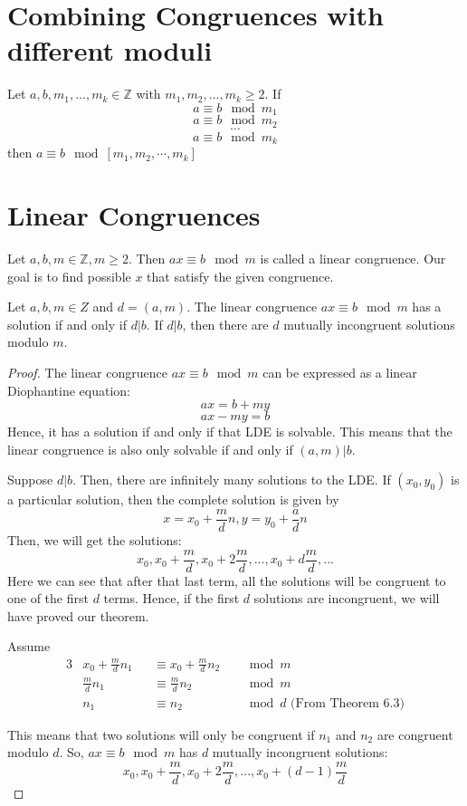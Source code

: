 \documentclass[12pt,letterpaper]{amsbook}
\theoremstyle{definition}
\newcommand{\Z}{\mathbb{Z}}
\begin{document}
\section{Combining Congruences with different moduli}
\phantom{}
\begin{theorem}
  Let $a,b,m_1,...,m_k \in \Z$ with $m_1,m_2,...,m_k \geq 2$. If
  \[a \equiv b \mod m_1\]
  \[a \equiv b \mod m_2\]
  \[\cdots\]
  \[a \equiv b \mod m_k\]
  then $a \equiv b \mod [m_1,m_2,\cdots,m_k]$
\end{theorem}

\section{Linear Congruences}

Let $a,b,m \in \Z, m \geq 2$. Then $ax \equiv b \mod m$ is called a linear congruence. Our goal is to find possible $x$ that satisfy the given congruence.

\begin{theorem}
  Let $a,b,m \in Z$ and $d = (a,m)$. The linear congruence $ax \equiv b \mod m$ has a solution if and only if $d | b$. If $d | b$, then there are $d$ mutually incongruent solutions modulo $m$.
\end{theorem}
\begin{proof}
  The linear congruence $ax \equiv b \mod m$ can be expressed as a linear Diophantine equation:
  \[ax = b + my\]
  \[ax - my = b\]
  Hence, it has a solution if and only if that LDE is solvable. This means that the linear congruence is also only solvable if and only if $(a,m) | b$.

  Suppose $d|b$. Then, there are infinitely many solutions to the LDE. If $(x_0,y_0)$ is a particular solution, then the complete solution is given by
  \[x = x_0 + \frac{m}{d}n, y = y_0 + \frac{a}{d}n\]
  Then, we will get the solutions:
\[x_0, x_0 + \frac{m}{d}, x_0 + 2\frac{m}{d},...,x_0 + d\frac{m}{d},...\]
Here we can see that after that last term, all the solutions will be congruent to one of the first $d$ terms. Hence, if the first $d$ solutions are incongruent, we will have proved our theorem.

Assume
\begin{alignat*}{3}
  &x_0 + \frac{m}{d}n_1 &&\equiv x_0 + \frac{m}{d} n_2 &&\mod m \\
  &\frac{m}{d}n_1 &&\equiv \frac{m}{d}n_2 &&\mod m \\
  &n_1 &&\equiv n_2 &&\mod d \text{ (From Theorem 6.3)}
\end{alignat*}

This means that two solutions will only be congruent if $n_1$ and $n_2$ are congruent modulo $d$. So, $ax \equiv b \mod m$ has $d$ mutually incongruent solutions:
\[x_0,x_0 + \frac{m}{d}, x_0 + 2\frac{m}{d},..., x_0 + (d-1)\frac{m}{d}\]
\end{proof}
\end{document}
